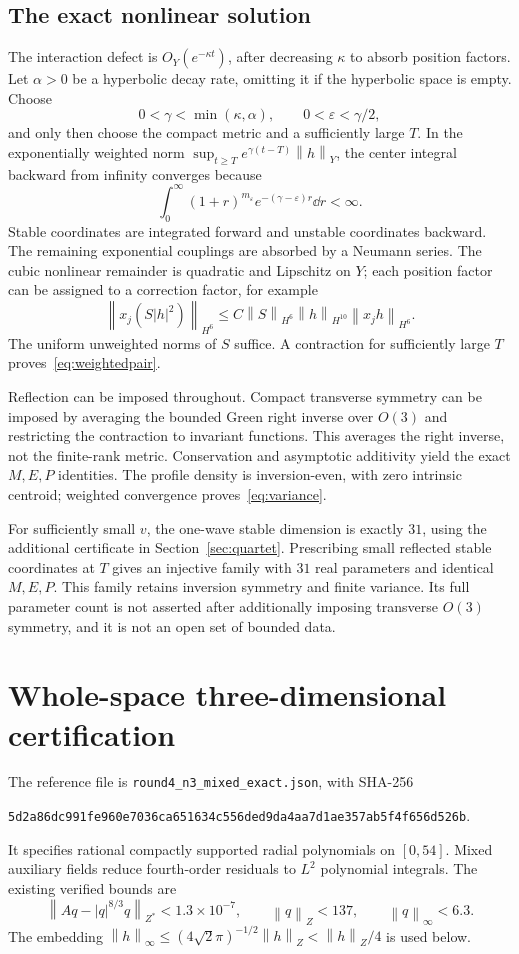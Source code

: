 \documentclass[11pt,a4paper]{article}
\theoremstyle{remark}\newtheorem{remark}[theorem]{Remark}
\newcommand{\norm}[1]{\left\|#1\right\|}
\begin{document}
\subsection{The exact nonlinear solution}
The interaction defect is $O_Y(e^{-\kappa t})$, after decreasing $\kappa$ to absorb position factors. Let $\alpha>0$ be a hyperbolic decay rate, omitting it if the hyperbolic space is empty. Choose
\[
 0<\gamma<\min(\kappa,\alpha),\qquad 0<\varepsilon<\gamma/2,
\]
and only then choose the compact metric and a sufficiently large $T$. In the exponentially weighted norm $\sup_{t\ge T}e^{\gamma(t-T)}\norm h_Y$, the center integral backward from infinity converges because
\[
 \int_0^\infty(1+r)^{m_\varepsilon}e^{-(\gamma-\varepsilon)r}\dd r<\infty.
\]
Stable coordinates are integrated forward and unstable coordinates backward. The remaining exponential couplings are absorbed by a Neumann series. The cubic nonlinear remainder is quadratic and Lipschitz on $Y$; each position factor can be assigned to a correction factor, for example
\[
 \norm{x_j(S|h|^2)}_{H^6}
 \le C\norm S_{H^6}\norm h_{H^{10}}\norm{x_jh}_{H^6}.
\]
The uniform unweighted norms of $S$ suffice. A contraction for sufficiently large $T$ proves~\eqref{eq:weightedpair}.

Reflection can be imposed throughout. Compact transverse symmetry can be imposed by averaging the bounded Green right inverse over $O(3)$ and restricting the contraction to invariant functions. This averages the right inverse, not the finite-rank metric. Conservation and asymptotic additivity yield the exact $M,E,P$ identities. The profile density is inversion-even, with zero intrinsic centroid; weighted convergence proves~\eqref{eq:variance}.

For sufficiently small $v$, the one-wave stable dimension is exactly $31$, using the additional certificate in Section~\ref{sec:quartet}. Prescribing small reflected stable coordinates at $T$ gives an injective family with $31$ real parameters and identical $M,E,P$. This family retains inversion symmetry and finite variance. Its full parameter count is not asserted after additionally imposing transverse $O(3)$ symmetry, and it is not an open set of bounded data.

\section{Whole-space three-dimensional certification}\label{sec:n3}
The reference file is \texttt{round4\_n3\_mixed\_exact.json}, with SHA-256
\begin{center}\small\texttt{5d2a86dc991fe960e7036ca651634c556ded9da4aa7d1ae357ab5f4f656d526b}.
\end{center}
It specifies rational compactly supported radial polynomials on $[0,54]$. Mixed auxiliary fields reduce fourth-order residuals to $L^2$ polynomial integrals. The existing verified bounds are
\[
 \norm{Aq-|q|^{8/3}q}_{Z^*}<1.3\times10^{-7},\qquad
 \norm q_Z<137,\qquad\norm q_\infty<6.3.
\]
The embedding $\norm h_\infty\le(4\sqrt2\pi)^{-1/2}\norm h_Z<\norm h_Z/4$ is used below.
\end{document}
